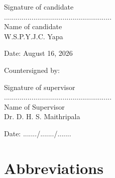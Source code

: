 \documentclass[12pt, a4paper]{article}
\begin{document}
	\vspace{2.5cm}
	
	\noindent
	\begin{minipage}[t]{0.6\textwidth}
		Signature of candidate \\[1.5cm]
		....................................................... \\[0.5cm]
		Name of candidate \\[0.5cm]
		W.S.P.Y.J.C. Yapa
	\end{minipage}%
	\begin{minipage}[t]{0.4\textwidth}
		Date: August 16, 2026
	\end{minipage}
	
	\vspace{3cm}
	
	\noindent Countersigned by:
	
	\vspace{1cm}
	
	\noindent
	\begin{minipage}[t]{0.6\textwidth}
		Signature of supervisor \\[1.5cm]
		....................................................... \\[0.5cm]
		Name of Supervisor \\[0.5cm]
		Dr. D. H. S. Maithripala
	\end{minipage}%
	\begin{minipage}[t]{0.4\textwidth}
		Date: ......./......./.......
	\end{minipage}
	\newpage


	\newpage
	
	\tableofcontents
	\newpage
	\listoffigures
	\newpage
	\listoftables
	\newpage
	
	\section*{Abbreviations}
	
\end{document}
